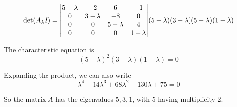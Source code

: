 \documentclass{article}
\begin{document}
  \[
    \begin{gathered}
    \text{det}(A_\lambda I)=
    \begin{vmatrix}
    5-\lambda &-2 &6 &-1\\
    0 &3-\lambda &-8 &0\\
    0 &0 &5-\lambda &4\\
    0 &0 &0 &1-\lambda
    \end{vmatrix}
    \end{gathered}\\
    (5-\lambda)(3-\lambda)(5-\lambda)(1-\lambda)
  \]

  The characteristic equation is 
  \[
    (5-\lambda)^{2}(3-\lambda)(1-\lambda)=0
  \]

  Expanding the product, we can also write
  \[
    \lambda^{4}-14\lambda^{3}+68\lambda^{2}-130\lambda+75=0
  \]

  So the matrix $ A $ has the eigenvalues $ 5,3,1 $, with $ 5 $ having multiplicity 2.
  
  


  


  
  


  
  
  
\end{document}
